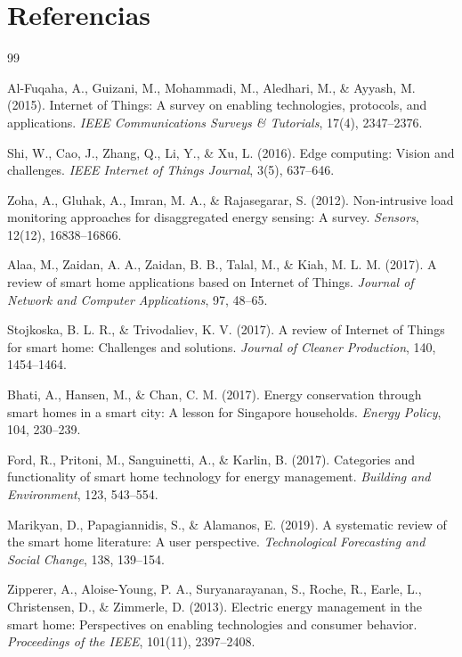 \documentclass[11pt,a4paper]{article}
\begin{document}
\section*{Referencias}
\begin{thebibliography}{99}\small

Al-Fuqaha, A., Guizani, M., Mohammadi, M., Aledhari, M., \& Ayyash, M. (2015).
Internet of Things: A survey on enabling technologies, protocols, and applications.
\emph{IEEE Communications Surveys \& Tutorials}, 17(4), 2347--2376.

Shi, W., Cao, J., Zhang, Q., Li, Y., \& Xu, L. (2016).
Edge computing: Vision and challenges.
\emph{IEEE Internet of Things Journal}, 3(5), 637--646.

Zoha, A., Gluhak, A., Imran, M. A., \& Rajasegarar, S. (2012).
Non-intrusive load monitoring approaches for disaggregated energy sensing: A survey.
\emph{Sensors}, 12(12), 16838--16866.

Alaa, M., Zaidan, A. A., Zaidan, B. B., Talal, M., \& Kiah, M. L. M. (2017).
A review of smart home applications based on Internet of Things.
\emph{Journal of Network and Computer Applications}, 97, 48--65.

Stojkoska, B. L. R., \& Trivodaliev, K. V. (2017).
A review of Internet of Things for smart home: Challenges and solutions.
\emph{Journal of Cleaner Production}, 140, 1454--1464.

Bhati, A., Hansen, M., \& Chan, C. M. (2017).
Energy conservation through smart homes in a smart city: A lesson for Singapore households.
\emph{Energy Policy}, 104, 230--239.

Ford, R., Pritoni, M., Sanguinetti, A., \& Karlin, B. (2017).
Categories and functionality of smart home technology for energy management.
\emph{Building and Environment}, 123, 543--554.

Marikyan, D., Papagiannidis, S., \& Alamanos, E. (2019).
A systematic review of the smart home literature: A user perspective.
\emph{Technological Forecasting and Social Change}, 138, 139--154.

Zipperer, A., Aloise-Young, P. A., Suryanarayanan, S., Roche, R., Earle, L., Christensen, D., \& Zimmerle, D. (2013).
Electric energy management in the smart home: Perspectives on enabling technologies and consumer behavior.
\emph{Proceedings of the IEEE}, 101(11), 2397--2408.


\end{thebibliography}
\end{document}
